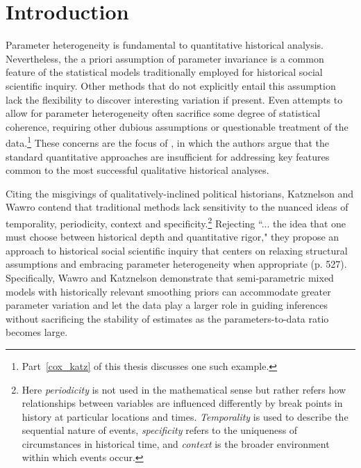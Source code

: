 \chapter{Introduction}
\label{introduction}

Parameter heterogeneity is fundamental to quantitative historical analysis. 
Nevertheless, the a priori assumption of parameter invariance is a common feature 
of the statistical models traditionally employed for historical social
scientific inquiry. Other methods that do not explicitly entail this assumption lack the flexibility to 
discover interesting variation if present.  Even attempts to allow for parameter heterogeneity 
often sacrifice some degree of statistical coherence, requiring other dubious assumptions or 
questionable treatment of the data.\footnote{Part~\ref{cox_katz} of this thesis discusses one 
such example.} These concerns are the focus of , in which the 
authors argue that the standard quantitative approaches are insufficient for addressing key 
features common to the most successful qualitative historical analyses. 


Citing the misgivings of qualitatively-inclined 
political historians, Katznelson and Wawro contend that traditional methods lack sensitivity to 
the nuanced ideas of temporality, periodicity, context and specificity.\footnote{Here 
{\it periodicity} is not used in the mathematical sense but rather refers how relationships between 
variables are influenced differently by break points in history at particular locations and times. 
{\it Temporality} is used to describe the sequential nature of events, {\it specificity} refers to   
the uniqueness of circumstances in historical time, and {\it context} is the broader environment 
within which events occur.}  
Rejecting ``... the idea that one must choose between historical depth and quantitative rigor," 
they propose an approach to historical social scientific inquiry that centers on relaxing structural 
assumptions and embracing parameter heterogeneity when appropriate (p. 527). Specifically, 
Wawro and Katznelson demonstrate that semi-parametric mixed models with historically relevant 
smoothing priors can accommodate greater parameter variation and let the data play a larger role 
in guiding inferences without sacrificing the stability of estimates as the parameters-to-data ratio 
becomes large.  

